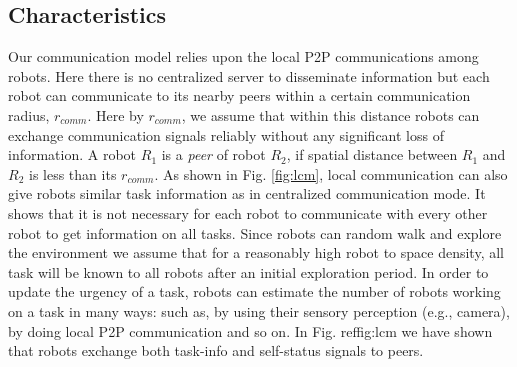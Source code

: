 \documentclass[letterpaper, 10 pt, conference]{ieeeconf}  %
\begin{document}
\subsection{Characteristics}
Our communication model relies upon the local P2P communications among robots. Here there is no centralized server to disseminate information but each robot can communicate to its nearby peers within a certain communication radius, $r_{comm}$. Here by $r_{comm}$, we assume that within this distance robots can exchange communication signals reliably without any significant loss of information. A robot $R_1$ is a {\em peer} of robot $R_2$, if spatial distance between $R_1$ and $R_2$ is less than its $r_{comm}$. As shown in Fig. \ref{fig:lcm}, local communication can also give robots similar task information as in centralized communication mode. It shows that it is not necessary for each robot to communicate with every other robot to get information on all tasks. Since robots can random walk and explore the environment we assume that for a reasonably high robot to space density, all task will be known to all robots after an initial exploration period. In order to update the urgency of a task, robots can estimate the number of robots working on a task in many ways: such as,  by using their sensory perception (e.g., camera), by doing local P2P communication and so on. In Fig. ref{fig:lcm} we have shown that robots exchange both task-info and self-status signals to peers.\\
\end{document}

